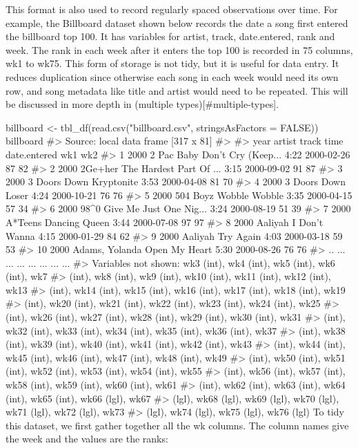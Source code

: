 This format is also used to record regularly spaced observations over time. For example, the Billboard dataset shown below records the date a song first entered the billboard top 100. It has variables for artist, track, date.entered, rank and week. The rank in each week after it enters the top 100 is recorded in 75 columns, wk1 to wk75. This form of storage is not tidy, but it is useful for data entry. It reduces duplication since otherwise each song in each week would need its own row, and song metadata like title and artist would need to be repeated. This will be discussed in more depth in (multiple types)[#multiple-types].

billboard <- tbl_df(read.csv("billboard.csv", stringsAsFactors = FALSE))
billboard
#> Source: local data frame [317 x 81]
#> 
#>    year         artist                   track time date.entered wk1 wk2
#> 1  2000          2 Pac Baby Don't Cry (Keep... 4:22   2000-02-26  87  82
#> 2  2000        2Ge+her The Hardest Part Of ... 3:15   2000-09-02  91  87
#> 3  2000   3 Doors Down              Kryptonite 3:53   2000-04-08  81  70
#> 4  2000   3 Doors Down                   Loser 4:24   2000-10-21  76  76
#> 5  2000       504 Boyz           Wobble Wobble 3:35   2000-04-15  57  34
#> 6  2000           98^0 Give Me Just One Nig... 3:24   2000-08-19  51  39
#> 7  2000        A*Teens           Dancing Queen 3:44   2000-07-08  97  97
#> 8  2000        Aaliyah           I Don't Wanna 4:15   2000-01-29  84  62
#> 9  2000        Aaliyah               Try Again 4:03   2000-03-18  59  53
#> 10 2000 Adams, Yolanda           Open My Heart 5:30   2000-08-26  76  76
#> ..  ...            ...                     ...  ...          ... ... ...
#> Variables not shown: wk3 (int), wk4 (int), wk5 (int), wk6 (int), wk7
#>   (int), wk8 (int), wk9 (int), wk10 (int), wk11 (int), wk12 (int), wk13
#>   (int), wk14 (int), wk15 (int), wk16 (int), wk17 (int), wk18 (int), wk19
#>   (int), wk20 (int), wk21 (int), wk22 (int), wk23 (int), wk24 (int), wk25
#>   (int), wk26 (int), wk27 (int), wk28 (int), wk29 (int), wk30 (int), wk31
#>   (int), wk32 (int), wk33 (int), wk34 (int), wk35 (int), wk36 (int), wk37
#>   (int), wk38 (int), wk39 (int), wk40 (int), wk41 (int), wk42 (int), wk43
#>   (int), wk44 (int), wk45 (int), wk46 (int), wk47 (int), wk48 (int), wk49
#>   (int), wk50 (int), wk51 (int), wk52 (int), wk53 (int), wk54 (int), wk55
#>   (int), wk56 (int), wk57 (int), wk58 (int), wk59 (int), wk60 (int), wk61
#>   (int), wk62 (int), wk63 (int), wk64 (int), wk65 (int), wk66 (lgl), wk67
#>   (lgl), wk68 (lgl), wk69 (lgl), wk70 (lgl), wk71 (lgl), wk72 (lgl), wk73
#>   (lgl), wk74 (lgl), wk75 (lgl), wk76 (lgl)
To tidy this dataset, we first gather together all the wk columns. The column names give the week and the values are the ranks:

